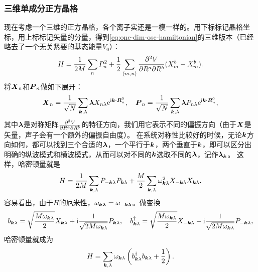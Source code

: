 \subsubsection{三维单成分正方晶格}

现在考虑一个三维的正方晶格，各个离子实还是一模一样的。用下标标记晶格坐标，用上标标记矢量的分量，得到\eqref{eq:one-dim-osc-hamiltonian}的三维版本（已经略去了一个无关紧要的基态能量$V_0$）：
\begin{equation}
    {H} = \frac{1}{2 M} \sum_n {P}_n^2 + \frac{1}{2} \sum_{\langle m, n \rangle} \pdv{V}{R^a}{R^b} (X_m^a - X_n^a) (X_m^b - X_m^b).
\end{equation}
将$\vb*{X}_n$和$\vb*{P}_n$做如下展开：
\begin{equation}
    \vb*{X}_n = \frac{1}{\sqrt{N}} \sum_{\vb*{k}, \lambda} \vb*{\lambda} X_{n \lambda} \mathrm{e}^{\mathrm{i} \vb*{k} \cdot \vb*{R}_n^0}, \quad \vb*{P}_n = \frac{1}{\sqrt{N}} \sum_{\vb*{k}, \lambda} \vb*{\lambda} P_{n \lambda} \mathrm{e}^{\mathrm{i} \vb*{k} \cdot \vb*{R}_n^0},
\end{equation}
其中$\vb*{\lambda}$是对称矩阵$\pdv{V}{R^a}{R^b}$的特征方向，我们用它表示不同的偏振方向（由于$\vb*{X}$是矢量，声子会有一个额外的偏振自由度）。
在系统对称性比较好的时候，无论$\vb*{k}$方向如何，都可以找到三个合适的$\vb*{\lambda}$，一个平行于$\vb*{k}$，两个垂直于$\vb*{k}$，即可以区分出明确的纵波模式和横波模式，从而可以对不同的$\vb*{k}$选取不同的$\vb*{\lambda}$，记作$\vb*{\lambda}_{\vb*{k}}$。
这样，哈密顿量就是
\begin{equation}
    {H} = \frac{1}{2 M} \sum_{\vb*{k}, \lambda} {P}_{-\vb*{k} \lambda} {P}_{\vb*{k}\lambda} + \frac{M}{2} \sum_{\vb*{k}, \lambda} \omega_{\vb*{k} \lambda}^2 {X}_{-\vb*{k} \lambda} {X}_{\vb*{k} \lambda}.
\end{equation}
容易看出，由于${H}$的厄米性，$\omega_{\vb*{k}\vb*{\lambda}} = \omega_{-\vb*{k} \vb*{\lambda}}$。做变换
\begin{equation}
    {b}_{\vb*{k} \lambda} = \sqrt{\frac{M \omega_{\vb*{k} \lambda}}{2}} {X}_{\vb*{k} \lambda} + \mathrm{i} \frac{1}{\sqrt{2 M \omega_{\vb*{k} \lambda}}} P_{\vb*{k} \lambda}, \quad {b}^\dagger_{\vb*{k} \lambda} = \sqrt{\frac{M \omega_{\vb*{k} \lambda}}{2}} {X}_{- \vb*{k} \lambda} - \mathrm{i} \frac{1}{\sqrt{2 M \omega_{\vb*{k} \lambda}}} P_{- \vb*{k} \lambda},
    \label{eq:transform-b-pq}
\end{equation}
哈密顿量就成为
\begin{equation}
    {H} = \sum_{\vb*{k}, \lambda} \omega_{\vb*{k} \lambda} \left( {b}^\dagger_{\vb*{k} \lambda} {b}_{\vb*{k} \lambda} + \frac{1}{2} \right).
\end{equation}

